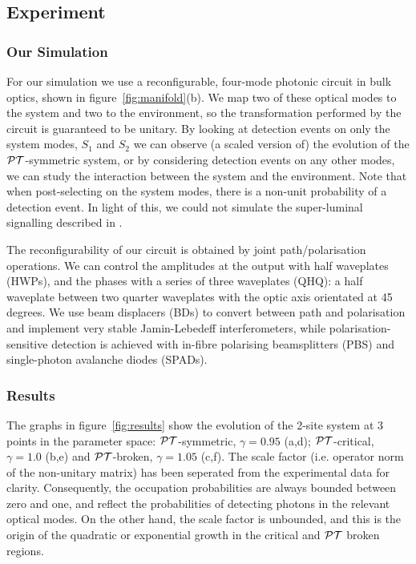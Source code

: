 \subsection{Experiment}
\subsubsection{Our Simulation}
For our simulation we use a reconfigurable, four-mode photonic circuit in bulk
optics, shown in figure~\ref{fig:manifold}(b). We map two of these optical modes
to the system and two to the environment, so the transformation performed by the
circuit is guaranteed to be unitary. By looking at detection events on only the
system modes, \(S_1\) and \(S_2\) we can observe (a scaled version of) the
evolution of the \(\mathcal{PT}\)-symmetric system, or by considering detection events on
any other modes, we can study the interaction between the system and the
environment. Note that when post-selecting on the system modes, there is a
non-unit probability of a detection event. In light of this, we could not
simulate the super-luminal signalling described in \cite{lee-prl-112-130404}.

The reconfigurability of our circuit is obtained by joint path/polarisation
operations. We can control the amplitudes at the output with half waveplates
(HWPs), and the phases with a series of three waveplates (QHQ): a half waveplate
between two quarter waveplates with the optic axis orientated at 45 degrees.
We use beam displacers (BDs) to convert between path and polarisation and
implement very stable Jamin-Lebedeff interferometers, while
polarisation-sensitive detection is achieved with in-fibre polarising
beamsplitters (PBS) and single-photon avalanche diodes (SPADs).

\subsubsection{Results}
The graphs in figure~\ref{fig:results} show the evolution of the 2-site system
at 3 points in the parameter space: \(\mathcal{PT}\)-symmetric, \(\gamma=0.95\) (a,d);
\(\mathcal{PT}\)-critical, \(\gamma=1.0\) (b,e) and \(\mathcal{PT}\)-broken, \(\gamma=1.05\)
(c,f). The scale factor (i.e. operator norm of the non-unitary matrix) has been
seperated from the experimental data for clarity. Consequently, the occupation
probabilities are always bounded between zero and one, and reflect the
probabilities of detecting photons in the relevant optical modes. On the other
hand, the scale factor is unbounded, and this is the origin of the quadratic or
exponential growth in the critical and \(\mathcal{PT}\) broken regions.

